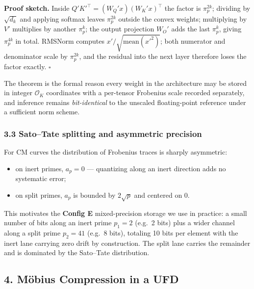 \documentclass[
  11pt,
]{article}
\providecommand{\tightlist}{%
  \setlength{\itemsep}{0pt}\setlength{\parskip}{0pt}}
\begin{document}
\textbf{Proof sketch.} Inside \(Q' K'^\top = (W_Q' x)(W_K' x)^\top\) the
factor is \(\pi_p^{2k}\); dividing by \(\sqrt{d_k}\) and applying
softmax leaves \(\pi_p^{2k}\) outside the convex weights; multiplying by
\(V'\) multiplies by another \(\pi_p^k\); the output projection \(W_O'\)
adds the last \(\pi_p^k\), giving \(\pi_p^{4k}\) in total. RMSNorm
computes \(x'/\!\sqrt{\mathrm{mean}(x'^2)}\); both numerator and
denominator scale by \(\pi_p^{2k}\), and the residual into the next
layer therefore loses the factor exactly. \(\square\)

The theorem is the formal reason every weight in the architecture may be
stored in integer \(\mathcal{O}_K\) coordinates with a per-tensor
Frobenius scale recorded separately, and inference remains
\emph{bit-identical} to the unscaled floating-point reference under a
sufficient norm scheme.

\hypertarget{satotate-splitting-and-asymmetric-precision}{%
\subsubsection{3.3 Sato--Tate splitting and asymmetric
precision}\label{satotate-splitting-and-asymmetric-precision}}

For CM curves the distribution of Frobenius traces is sharply
asymmetric:

\begin{itemize}
\tightlist
\item
  on inert primes, \(a_p = 0\) --- quantizing along an inert direction
  adds no systematic error;
\item
  on split primes, \(a_p\) is bounded by \(2\sqrt p\) and centered on
  \(0\).
\end{itemize}

This motivates the \textbf{Config E} mixed-precision storage we use in
practice: a small number of bits along an inert prime \(p_1 = 2\)
(e.g.~2 bits) plus a wider channel along a split prime \(p_2 = 41\)
(e.g.~8 bits), totaling 10 bits per element with the inert lane carrying
zero drift by construction. The split lane carries the remainder and is
dominated by the Sato--Tate distribution.

\hypertarget{muxf6bius-compression-in-a-ufd}{%
\subsection{4. Möbius Compression in a
UFD}\label{muxf6bius-compression-in-a-ufd}}
\end{document}
